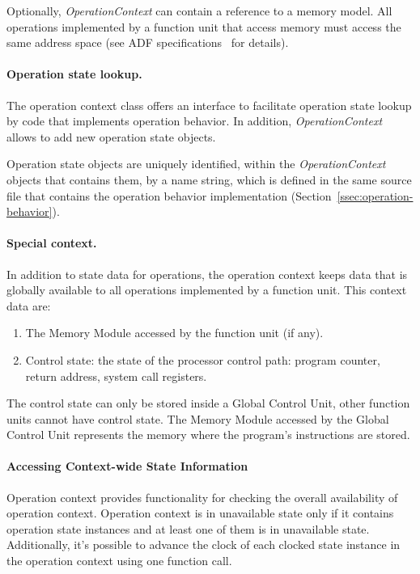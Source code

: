 \documentclass[twoside]{tce}
\begin{document}
Optionally, \emph{OperationContext} can contain a reference to a memory
model.  All operations implemented by a function unit that access memory
must access the same address space (see ADF specifications~\cite{ADF-specs}
for details).

\paragraph{Operation state lookup.}
The operation context class offers an interface to facilitate operation
state lookup by code that implements operation behavior.  In addition,
\emph{OperationContext} allows to add new operation state objects.

Operation state objects are uniquely identified, within the
\emph{OperationContext} objects that contains them, by a name string, which
is defined in the same source file that contains the operation behavior
implementation (Section~\ref{ssec:operation-behavior}).

\paragraph{Special context.}
In addition to state data for operations, the operation context keeps data
that is globally available to all operations implemented by a function unit.
This context data are:
\begin{enumerate}
\item %
  The Memory Module accessed by the function unit (if any).
\item %
  Control state: the state of the processor control path: program counter,
  return address, system call registers.
\end{enumerate}

The control state can only be stored inside a Global Control Unit, other
function units cannot have control state.  The Memory Module accessed by the
Global Control Unit represents the memory where the program's instructions
are stored.

\paragraph{Accessing Context-wide State Information}

Operation context provides functionality for checking the overall availability
of operation context. Operation context is in unavailable state only if
it contains operation state instances and at least one of them is in
unavailable state. Additionally, it's possible to advance the clock of
each clocked state instance in the operation context using one function call.
\end{document}

